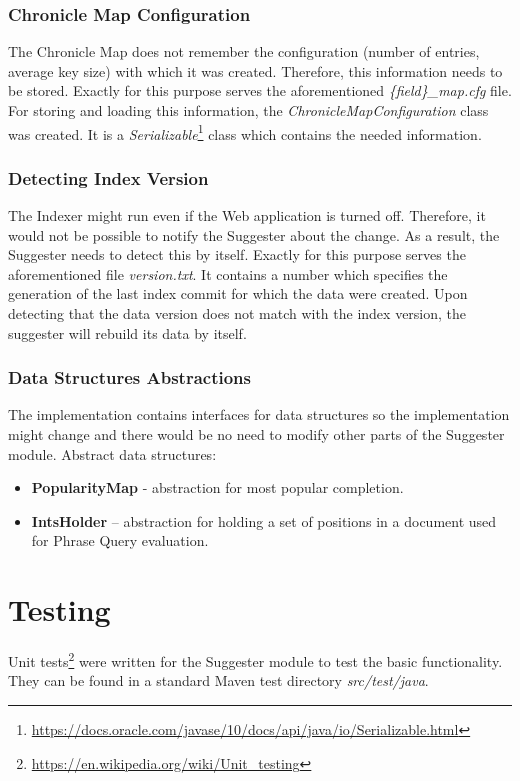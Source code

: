 \subsubsection{Chronicle Map Configuration}
The Chronicle Map does not remember the configuration (number of entries, average key size) with which it was created.
Therefore, this information needs to be stored. Exactly for this purpose serves the aforementioned
\textit{\{field\}\_map.cfg} file. For storing and loading this information, the \textit{ChronicleMapConfiguration}
class was created. It is a \textit{Serializable}\footnote{\url{https://docs.oracle.com/javase/10/docs/api/java/io/Serializable.html}}
class which contains the needed information.

\subsubsection{Detecting Index Version}
The Indexer might run even if the Web application is turned off. Therefore, it would not be possible to notify the
Suggester about the change. As a result, the Suggester needs to detect this by itself. Exactly for this purpose serves the
aforementioned file \textit{version.txt}. It contains a number which specifies the generation of the last index commit
for which the data were created.
Upon detecting that the data version does not match with the index version, the suggester will rebuild its data by itself.

\subsubsection{Data Structures Abstractions}
The implementation contains interfaces for data structures so the implementation might change and there would be no need to
modify other parts of the Suggester module. Abstract data structures:
\begin{itemize}
    \item \textbf{PopularityMap} - abstraction for most popular completion.
    \item \textbf{IntsHolder} – abstraction for holding a set of positions in a document used for Phrase Query evaluation.
\end{itemize}

\section{Testing}
Unit tests\footnote{\url{https://en.wikipedia.org/wiki/Unit_testing}} were written for the Suggester module to test
the basic functionality. They can be found in a standard Maven test directory \textit{src/test/java}.

